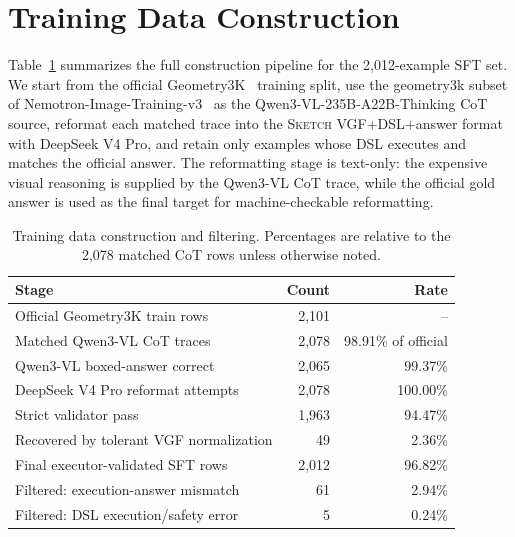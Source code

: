 \documentclass{article}
\newcommand{\sketch}{\textsc{Sketch}}
\begin{document}



\appendix
{}

\section{Training Data Construction}
\label{app:data-construction}

Table~\ref{tab:data-construction} summarizes the full construction pipeline for the 2,012-example SFT set. We start from the official Geometry3K~\citep{lu2021inter} training split, use the geometry3k subset of Nemotron-Image-Training-v3~\citep{blakeman2025nvidia} as the Qwen3-VL-235B-A22B-Thinking CoT source, reformat each matched trace into the \sketch{} VGF+DSL+answer format with DeepSeek V4 Pro, and retain only examples whose DSL executes and matches the official answer. The reformatting stage is text-only: the expensive visual reasoning is supplied by the Qwen3-VL CoT trace, while the official gold answer is used as the final target for machine-checkable reformatting.

\begin{table}[h]
\centering
\caption{Training data construction and filtering. Percentages are relative to the 2,078 matched CoT rows unless otherwise noted.}
\label{tab:data-construction}
\small
\begin{tabular}{lrr}
\toprule
Stage & Count & Rate \\
\midrule
Official Geometry3K train rows & 2,101 & -- \\
Matched Qwen3-VL CoT traces & 2,078 & 98.91\% of official \\
Qwen3-VL boxed-answer correct & 2,065 & 99.37\% \\
DeepSeek V4 Pro reformat attempts & 2,078 & 100.00\% \\
Strict validator pass & 1,963 & 94.47\% \\
Recovered by tolerant VGF normalization & 49 & 2.36\% \\
Final executor-validated SFT rows & 2,012 & 96.82\% \\
\midrule
Filtered: execution-answer mismatch & 61 & 2.94\% \\
Filtered: DSL execution/safety error & 5 & 0.24\% \\
\bottomrule
\end{tabular}
\end{table}
\end{document}
